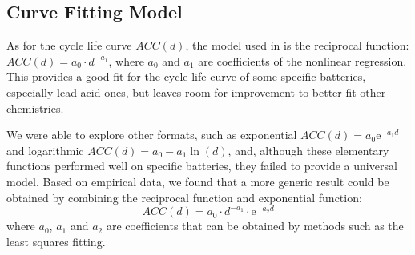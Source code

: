 \documentclass{ieeeaccess}
\begin{document}
    \subsection{Curve Fitting Model}
    As for the cycle life curve $ACC(d)$, the model used in \cite{HAN2014} is the reciprocal function: $ACC(d) = a_{0} \cdot d^{-a_{1}}$, where $a_{0}$ and $a_{1}$ are coefficients of the nonlinear regression. This provides a good fit for the cycle life curve of some specific batteries, especially lead-acid ones, but leaves room for improvement to better fit other chemistries.

    We were able to explore other formats, such as exponential $ACC(d) = a_0 \mathrm{e}^{-a_1 d}$ and logarithmic $ACC(d) = a_0 - a_1 \ln(d)$, and, although these elementary functions performed well on specific batteries, they failed to provide a universal model. Based on empirical data, we found that a more generic result could be obtained by combining the reciprocal function and exponential function:
    \begin{equation}
        ACC(d) = a_0 \cdot d^{-a_1} \cdot \mathrm{e}^{-a_2 d}
        \label{eq:ACC(d)}
    \end{equation}
    where $a_0$, $a_1$ and $a_2$ are coefficients that can be obtained by methods such as the least squares fitting.
\end{document}
